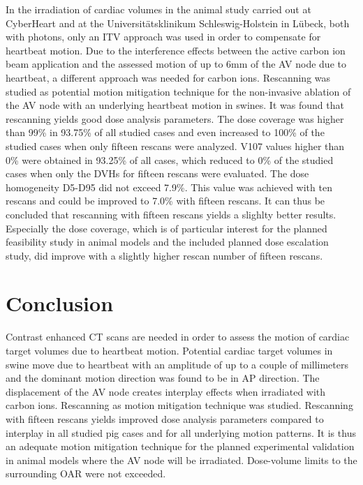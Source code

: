 \documentclass[type=dr, dr=rernat, accentcolor=tud7b,colorbacktitle, bigchapter, openright, twoside, 12pt ]{tudthesis}
\begin{document}
In the irradiation of cardiac volumes in the animal study carried out at CyberHeart and at the Universit\"atsklinikum 
Schleswig-Holstein in L\"ubeck, both with photons, only an ITV approach was used in order to compensate for heartbeat motion. Due to the 
interference effects between the active carbon ion beam application and the assessed motion of up to 6mm of the AV node due to heartbeat, 
a different approach was needed for carbon ions. Rescanning was studied as potential motion mitigation technique for the non-invasive 
ablation of the AV node with an underlying heartbeat motion in swines.\newline
\newline
It was found that rescanning yields good dose analysis parameters. The dose coverage was higher than 99\% in 93.75\% of all studied cases 
and even increased to 100\% of the studied cases when only fifteen rescans were analyzed. V107 values higher than 0\% were obtained 
in 93.25\% of all cases, which reduced to 0\% of the studied cases when only the DVHs for fifteen rescans were evaluated. The 
dose homogeneity D5-D95 did not exceed 7.9\%. This value was achieved with ten rescans and could be improved to 7.0\% with fifteen rescans. 
It can thus be concluded that rescanning with fifteen rescans yields a slighlty better results. Especially the 
dose coverage, which is of particular interest for the planned feasibility study in animal models and the included planned dose escalation 
study, did improve with a slightly higher rescan number of fifteen rescans. 



\vspace*{-0.3cm}
\section{Conclusion}

Contrast enhanced CT scans are needed in order to assess the motion of cardiac target volumes due to heartbeat motion. 
Potential cardiac target volumes in swine move due to heartbeat with an amplitude of up to a couple of millimeters and the 
dominant motion direction was found to be in AP direction. The displacement of the AV node creates interplay effects when 
irradiated with carbon ions. Rescanning as motion mitigation technique was studied. 
Rescanning with fifteen rescans yields improved dose analysis parameters compared to interplay in all studied pig cases and for all 
underlying motion patterns. It is thus an adequate motion mitigation technique for the planned experimental validation in animal models 
where the AV node will be irradiated. Dose-volume limits to the surrounding OAR were not exceeded. 
\end{document}
